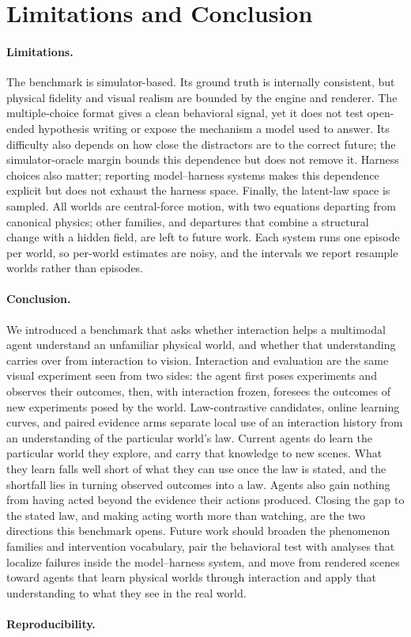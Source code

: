 \section{Limitations and Conclusion}
\label{sec:conclusion}

\paragraph{Limitations.} The benchmark is simulator-based. Its ground truth is internally consistent, but physical fidelity and visual realism are bounded by the engine and renderer. The multiple-choice format gives a clean behavioral signal, yet it does not test open-ended hypothesis writing or expose the mechanism a model used to answer. Its difficulty also depends on how close the distractors are to the correct future; the simulator-oracle margin bounds this dependence but does not remove it. Harness choices also matter; reporting model--harness systems makes this dependence explicit but does not exhaust the harness space. Finally, the latent-law space is sampled. All worlds are central-force motion, with two equations departing from canonical physics; other families, and departures that combine a structural change with a hidden field, are left to future work. Each system runs one episode per world, so per-world estimates are noisy, and the intervals we report resample worlds rather than episodes. 

\paragraph{Conclusion.} We introduced a benchmark that asks whether interaction helps a multimodal agent understand an unfamiliar physical world, and whether that understanding carries over from interaction to vision. Interaction and evaluation are the same visual experiment seen from two sides: the agent first poses experiments and observes their outcomes, then, with interaction frozen, foresees the outcomes of new experiments posed by the world. Law-contrastive candidates, online learning curves, and paired evidence arms separate local use of an interaction history from an understanding of the particular world's law. Current agents do learn the particular world they explore, and carry that knowledge to new scenes. What they learn falls well short of what they can use once the law is stated, and the shortfall lies in turning observed outcomes into a law. Agents also gain nothing from having acted beyond the evidence their actions produced. Closing the gap to the stated law, and making acting worth more than watching, are the two directions this benchmark opens. Future work should broaden the phenomenon families and intervention vocabulary, pair the behavioral test with analyses that localize failures inside the model--harness system, and move from rendered scenes toward agents that learn physical worlds through interaction and apply that understanding to what they see in the real world.

\paragraph{Reproducibility.} 
